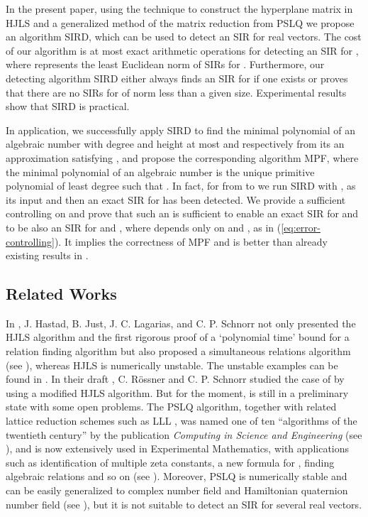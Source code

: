 \documentclass{sig-alternate}
\numberwithin{theorem}{section} \numberwithin{equation}{section}
\begin{document}
In the present paper, using  the technique to construct the
hyperplane matrix in HJLS and a generalized method of the matrix
reduction from PSLQ we propose an algorithm SIRD, which can be
used to detect an SIR for  real vectors. The cost of our algorithm is at most  exact arithmetic operations for detecting an SIR for
, where  represents the least Euclidean norm of SIRs
for . Furthermore, our detecting algorithm SIRD  either always
finds an SIR for  if one exists or proves that there are no SIRs
for  of norm less than a given size. Experimental results show
that SIRD is practical.

In application, we successfully apply  SIRD to find the minimal
polynomial of an algebraic number  with
degree and height at most  and  respectively from its an
approximation  satisfying , and propose the
corresponding algorithm MPF, where  the
minimal polynomial of an algebraic number  is the unique
primitive polynomial  of least degree such
that .
In fact, for  from  to  we run  SIRD with
,
 as its input and then an exact SIR for
 has been detected. We provide  a sufficient controlling on  and prove that
such an  is sufficient to enable an exact SIR for
 and  to be also an SIR for
 and ,
where  depends only on  and , as in
(\ref{eq:error-controlling}). It implies the correctness of MPF and
is better than already existing results in \cite{Jus1989,QFC2009}.
\subsection{Related Works}
In \cite{HHL1986, HJL1989}, J. Hastad, B. Just, J. C. Lagarias, and
C. P. Schnorr not only presented the HJLS algorithm and the first
rigorous proof of a `polynomial time' bound for a relation finding
algorithm but also proposed a simultaneous relations algorithm (see
 \cite[section 5]{HJL1989}), whereas HJLS
 is numerically unstable. The unstable examples can be
found in \cite{FB1992, FBA1999}. In their draft \cite{RS1997}, C. R{\"o}ssner and C. P.
Schnorr studied the case of  by using a modified HJLS
algorithm. But for the moment, \cite{RS1997} is still in a
preliminary state with some open problems. The PSLQ algorithm,
together with related lattice reduction schemes such as LLL
\cite{LLL1982}, was named one of ten ``algorithms of the twentieth
century'' by the publication \emph{Computing in Science and
Engineering} (see \cite{DS2000, BBC2007}), and is now extensively
used in Experimental Mathematics, with applications such as
identification of multiple zeta constants,
a new formula for , finding algebraic relations and so on (see \cite{BB2001, BBC2007, BB2009}). Moreover,
PSLQ is numerically stable and can be easily generalized to complex
number field and Hamiltonian quaternion number field (see
\cite{FBA1999}), but
 it is not suitable to
detect an SIR for several real vectors.\\
\end{document}
